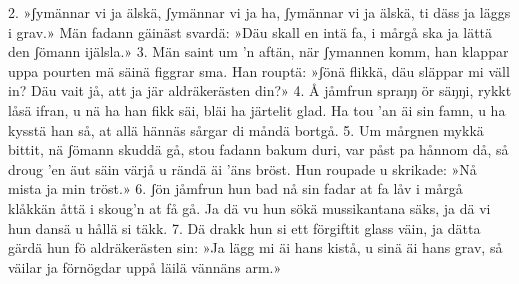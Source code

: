 \begin{adjustwidth}{7mm}{7mm}
2.  »ʃymännar vi ja älskä, ʃymännar vi ja ha,
    ʃymännar vi ja älskä, ti däss ja läggs i grav.»
    Män fadann gäinäst svardä: »Däu skall en intä fa,
    i mårgå ska ja lättä den ʃömann ijälsla.»
3.  Män saint um ’n aftän, när ʃymannen komm,
    han klappar uppa pourten mä säinä figgrar sma.
    Han rouptä: »ʃönä flikkä, däu släppar mi väll in?
    Däu vait jå, att ja jär aldräkerästen din?»
4.  Å jåmfrun spraŋŋ ör säŋŋi, rykkt låsä ifran,
    u nä ha han fikk säi, bläi ha järtelit glad.
    Ha tou ’an äi sin famn, u ha kysstä han så,
    at allä hännäs sårgar di måndä bortgå.
5.  Um mårgnen mykkä bittit, nä ʃömann skuddä gå,
    stou fadann bakum duri, var påst pa hånnom då,
    så droug ’en äut säin värjå u rändä äi ’äns bröst.
    Hun roupade u skrikade: »Nå mista ja min tröst.»
6.  ʃön jåmfrun hun bad nå sin fadar at fa låv
    i mårgå klåkkän åttä i skoug’n at få gå.
    Ja dä vu hun sökä mussikantana säks,
    ja dä vi hun dansä u hållä si täkk.
7.  Dä drakk hun si ett förgiftit glass väin,
    ja dätta gärdä hun fö aldräkerästen sin:
    »Ja lägg mi äi hans kistå, u sinä äi hans grav,
    så väilar ja förnögdar uppå läilä vännäns arm.»
\end{adjustwidth}
